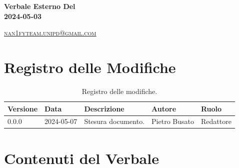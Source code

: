 \documentclass[8pt]{article}
\begin{document}
\begin{titlepage}
\begin{minipage}[t]{0.47\textwidth}
{		}
		\vspace{4mm}\vspace{4mm}
	\end{minipage}
	\vspace{4cm}
	\begin{center}
		\begin{flushright}
			{\fontsize{30pt}{52pt}\selectfont \textbf{Verbale Esterno Del\\2024-05-03\\}} %
		\end{flushright}
		\vspace{3cm}
	\end{center}
	\vspace{8.5 cm}
	{\small \textsc{\href{mailto: nan1fyteam.unipd@gmail.com}{nan1fyteam.unipd@gmail.com}}}
\end{titlepage}

\pagestyle{mystyle}
\section*{Registro delle Modifiche}
\begin{table}[ht!]	
	\centering
	\begin{tabular}{p{1.2cm} p{2cm} p{6cm} p{3cm} p{2cm}}
		\toprule
		\textbf{Versione}& \textbf{Data} & \textbf{Descrizione} & \textbf{Autore} & \textbf{Ruolo} \\
		\midrule
		0.0.0 & 2024-05-07 & Stesura documento.  & Pietro Busato & Redattore \\
		\bottomrule
	\end{tabular}
	\caption{Registro delle modifiche.}
	\label{table:Registro delle modifiche}
\end{table}
\newpage
\tableofcontents
\clearpage
\newpage
\justifying
\section{Contenuti del Verbale}
\end{document}
